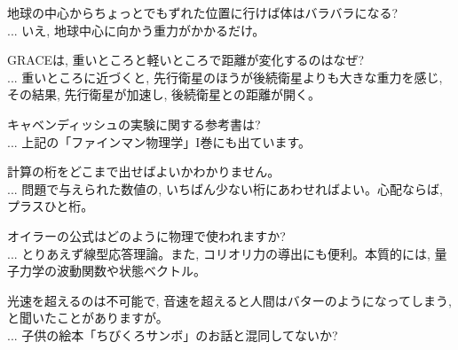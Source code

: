 \item 地球の中心からちょっとでもずれた位置に行けば体はバラバラになる? \\
... いえ, 地球中心に向かう重力がかかるだけ。
\item GRACEは, 重いところと軽いところで距離が変化するのはなぜ? \\
... 重いところに近づくと, 先行衛星のほうが後続衛星よりも大きな重力を感じ, その結果, 
先行衛星が加速し, 後続衛星との距離が開く。
\item キャベンディッシュの実験に関する参考書は? \\
... 上記の「ファインマン物理学」I巻にも出ています。
\item 計算の桁をどこまで出せばよいかわかりません。\\
... 問題で与えられた数値の, いちばん少ない桁にあわせればよい。心配ならば, プラスひと桁。
\item オイラーの公式はどのように物理で使われますか? \\
... とりあえず線型応答理論。また, コリオリ力の導出にも便利。本質的には, 
量子力学の波動関数や状態ベクトル。

\item 光速を超えるのは不可能で, 音速を超えると人間はバターのようになってしまう, 
と聞いたことがありますが。\\
... 子供の絵本「ちびくろサンボ」のお話と混同してないか? 

